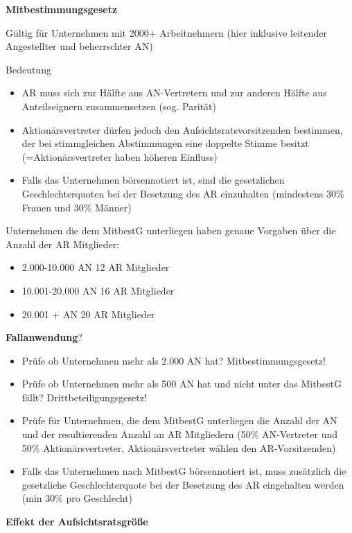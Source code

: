 \documentclass[
]{article}
\providecommand{\tightlist}{%
  \setlength{\itemsep}{0pt}\setlength{\parskip}{0pt}}
\begin{document}
\textbf{Mitbestimmungsgesetz}

Gültig für Unternehmen mit 2000+ Arbeitnehmern (hier inklusive leitender
Angestellter und beherrschter AN)

Bedeutung

\begin{itemize}
\tightlist
\item
  AR muss sich zur Hälfte aus AN-Vertretern und zur anderen Hälfte aus
  Anteilseignern zusammensetzen (sog. Parität)
\item
  Aktionärsvertreter dürfen jedoch den Aufsichtsratsvorsitzenden
  bestimmen, der bei stimmgleichen Abstimmungen eine doppelte Stimme
  besitzt (=Aktionärsvertreter haben höheren Einfluss)
\item
  Falls das Unternehmen börsennotiert ist, sind die gesetzlichen
  Geschlechterquoten bei der Besetzung des AR einzuhalten (mindestens
  30\% Frauen und 30\% Männer)
\end{itemize}

Unternehmen die dem MitbestG unterliegen haben genaue Vorgaben über die
Anzahl der AR Mitglieder:

\begin{itemize}
\tightlist
\item
  2.000-10.000 AN 12 AR Mitglieder
\item
  10.001-20.000 AN 16 AR Mitglieder
\item
  20.001 + AN 20 AR Mitglieder
\end{itemize}

\textbf{Fallanwendung}?

\begin{itemize}
\tightlist
\item
  Prüfe ob Unternehmen mehr als 2.000 AN hat? Mitbestimmungsgesetz!
\item
  Prüfe ob Unternehmen mehr als 500 AN hat und nicht unter das MitbestG
  fällt? Drittbeteiligungsgesetz!
\item
  Prüfe für Unternehmen, die dem MitbestG unterliegen die Anzahl der AN
  und der resultierenden Anzahl an AR Mitgliedern (50\% AN-Vertreter und
  50\% Aktionärsvertreter, Aktionärsvertreter wählen den
  AR-Vorsitzenden)
\item
  Falls das Unternehmen nach MitbestG börsennotiert ist, muss zusätzlich
  die gesetzliche Geschlechterquote bei der Besetzung des AR eingehalten
  werden (min 30\% pro Geschlecht)
\end{itemize}

\textbf{Effekt der Aufsichtsratsgröße}
\end{document}
